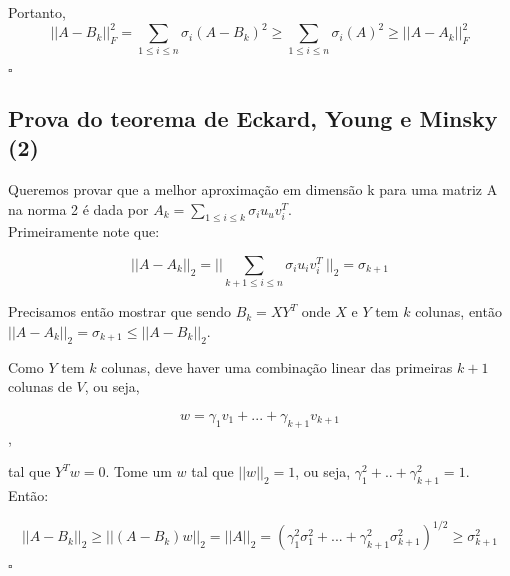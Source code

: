 Portanto, 
\[||A-B_k||^2_F =\sum_{1\leq i \leq n} \sigma_i (A-B_k)^2 \geq 
 \sum_{1\leq i \leq n} \sigma_i (A)^2 \geq||A-A_k||^2_F  \]

\begin{flushright}
$\square$
\end{flushright}

\subsection{Prova do teorema de Eckard, Young e Minsky (2)}

Queremos provar que a melhor aproximação em dimensão k para uma matriz A na norma 2 é dada por $A_k = \sum_{1\leq i \leq k} \sigma_i u_u v_i^T $.\\


Primeiramente note que:

\[||A-A_k||_2 =|| \sum_{k+1\leq i \leq n} \sigma_i u_i v_i^T   \ ||_2 =\sigma_{k+1} \]

Precisamos então mostrar que sendo $B_k = XY^T$ onde $X$ e $Y$ tem $k$ colunas, então $||A-A_k||_2=\sigma_{k+1}\leq ||A-B_k||_2$.

Como $Y$ tem $k$ colunas, deve haver uma combinação linear das primeiras $k+1$ colunas de $V$, ou seja,

\[w=\gamma_1v_1+...+\gamma_{k+1}v_{k+1}    \],

tal que $Y^Tw=0$. Tome um $w$ tal que $||w||_2=1$, ou seja, $\gamma_1^2+..+\gamma_{k+1}^2=1$. Então:

\[||A-B_k||_2\geq||(A-B_k)w||_2=||A||_2 = (\gamma_1^2\sigma_1^2+...+\gamma_{k+1}^2\sigma_{k+1}^2)^{1/2} \geq \sigma_{k+1}^2     \]

\begin{flushright}
$\square$
\end{flushright}




